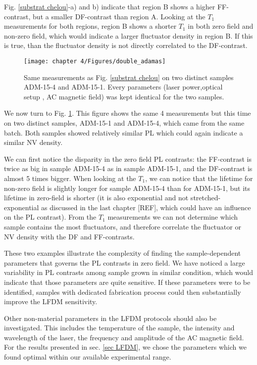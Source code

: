 \documentclass[a4paper,11pt]{report}
\begin{document}
\begin{refsection}
Fig. \ref{substrat chelou}-a) and b) indicate that region B shows a higher FF-contrast, but a smaller DF-contrast than region A. Looking at the $T_1$ measurements for both regions, region B shows a shorter $T_1$ in both zero field and non-zero field, which would indicate a larger fluctuator density in region B. If this is true, than the fluctuator density is not directly correlated to the DF-contrast.

\begin{figure}[h!]
\centering
\texttt{[image: chapter 4/Figures/double\_adamas]}
\caption{Same measurements as Fig. \ref{substrat chelou} on two distinct samples ADM-15-4 and ADM-15-1. Every parameters (laser power,optical setup , AC magnetic field) was kept identical for the two samples.}
\label{double dragon}
\end{figure}

We now turn to Fig. \ref{double dragon}. This figure shows the same 4 measurements but this time on two distinct samples, ADM-15-1 and ADM-15-4, which came from the same batch. Both samples showed relatively similar PL which could again indicate a similar NV density.

We can first notice the disparity in the  zero field PL contrasts: the FF-contrast is twice as big in sample ADM-15-4 as in sample ADM-15-1, and the DF-contrast is almost 5 times bigger. When looking at the $T_1$, we can notice that the lifetime for non-zero field is slightly longer for sample ADM-15-4 than for ADM-15-1, but its lifetime in zero-field is shorter (it is also exponential and not stretched-exponential as discussed in the last chapter [REF], which could have an influence on the PL contrast). From the $T_1$ measurements we can not determine which sample contains the most fluctuators, and therefore correlate the fluctuator or NV density with the DF and FF-contrasts.

These two examples illustrate the complexity of finding the sample-dependent parameters that governs the PL contrasts in zero field. We have noticed a large variability in PL contrasts among sample grown in similar condition, which would indicate that those parameters are quite sensitive. If these parameters were to be identified, samples with dedicated fabrication process could then substantially improve the LFDM sensitivity.

Other non-material parameters in the LFDM protocols should also be investigated. This includes the temperature of the sample, the intensity and wavelength of the laser, the frequency and amplitude of the AC magnetic field. For the results presented in sec. \ref{sec LFDM}, we chose the parameters which we found optimal within our available experimental range.



\end{refsection}
\end{document}
